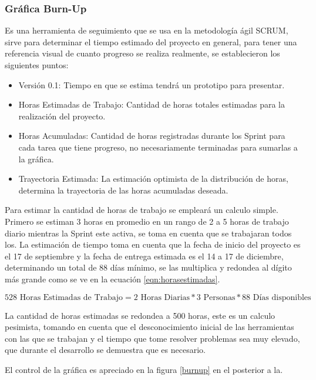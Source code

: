 \subsubsection{Gráfica Burn-Up}

Es una herramienta de seguimiento que se usa en la metodología ágil SCRUM, sirve para determinar el tiempo estimado del proyecto en general, para tener una referencia visual de cuanto progreso se realiza realmente, se establecieron los siguientes puntos:

\begin{itemize}
	\item Versión 0.1: Tiempo en que se estima tendrá un prototipo para presentar.
	\item Horas Estimadas de Trabajo: Cantidad de horas totales estimadas para la realización del proyecto.
	\item Horas Acumuladas: Cantidad de horas registradas durante los Sprint para cada tarea que tiene progreso, no necesariamente terminadas para sumarlas a la gráfica. 
	\item Trayectoria Estimada: La estimación optimista de la distribución de horas, determina la trayectoria de las horas acumuladas deseada.
\end{itemize}

Para estimar la cantidad de horas de trabajo se empleará un calculo simple.
 Primero se estiman 3 horas en promedio en un rango de 2 a 5 horas de trabajo diario mientras la Sprint este activa, se toma en cuenta que se trabajaran todos los. La estimación de tiempo toma en cuenta que la fecha de inicio del proyecto es el 17 de septiembre y la fecha de entrega estimada es el 14 a 17 de diciembre, determinando un total de 88 días mínimo, se las multiplica y redondea al dígito más grande como se ve en la ecuación \ref{eqn:horasestimadas}.
 
\begin{equation} 
\label{eqn:horasestimadas} 
	528 \text{ Horas Estimadas de Trabajo} = 2 \text{ Horas Diarias} * 3 \text{ Personas} * 88 \text{ Días disponibles}	
\end{equation}

La cantidad de horas estimadas se redondea a 500 horas, este es un calculo pesimista, tomando en cuenta que el desconocimiento inicial de las herramientas con las que se trabajan y el tiempo que tome resolver problemas sea muy elevado, que durante el desarrollo se demuestra que es necesario.

El control de la gráfica es apreciado en la figura \ref{burnup} en el  posterior a la.

